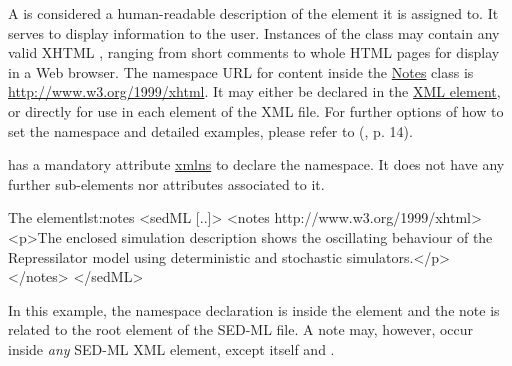\label{class:notes}

A  is considered a  human-readable description of the element it is assigned to. It serves to display information to the user. 
Instances of the  class may contain any valid XHTML \citep{P+02}, ranging from short comments to whole HTML pages for display in a Web browser. 
The namespace URL for  content inside the \hyperref[class:notes]{Notes} class is \url{http://www.w3.org/1999/xhtml}. It may either be declared in the \hyperref[class:sed-ml]{ XML element}, or directly for use in each  element of the XML file. For further options of how to set the namespace and detailed examples, please refer to (\citep{HBH+10}, p. 14).

 has a mandatory attribute \hyperref[sec:xmlns]{xmlns} to declare the  namespace. It does not have any further sub-elements nor attributes associated to it.
%

%
\begin{myXmlLst}{The  element}{lst:notes}
<sedML [..]>
 <notes http://www.w3.org/1999/xhtml>
  <p>The enclosed simulation description shows the oscillating behaviour of 
     the Repressilator model using deterministic and stochastic simulators.</p>
 </notes>
</sedML>
\end{myXmlLst}
%
In this example, the namespace declaration is inside the  element and the note is related to the  root element of the SED-ML file. A note may, however, occur inside \emph{any} SED-ML XML element, except  itself and \hyperref[class:annotation]{}.

